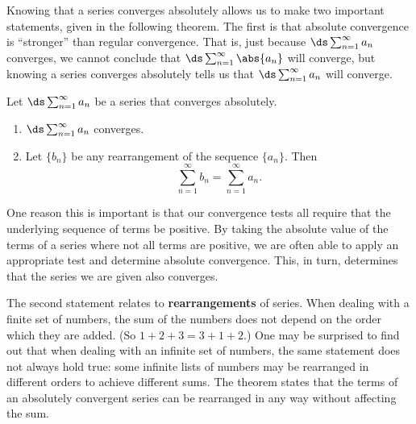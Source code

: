 Knowing that a series converges absolutely allows us to make two important statements, given in the following theorem. The first is that absolute convergence is  ``stronger'' than regular convergence.\vspace{-.5\baselineskip}
That is, just because {\small$\ds \sum_{n=1}^\infty a_n$} converges, we cannot conclude that {\small$\ds \sum_{n=1}^\infty \abs{a_n}$} will converge, but knowing a series converges absolutely tells us that {\small$\ds \sum_{n=1}^\infty a_n$} will converge. 

\begin{theorem}\label{thm:abs_convergence}%
Let $\ds \sum_{n=1}^\infty a_n$ be a series that converges absolutely.
\begin{enumerate}
	\item $\ds \sum_{n=1}^\infty a_n$ converges.
	\item	Let $\{b_n\}$ be any rearrangement of the sequence $\{a_n\}$. Then 
	\[\sum_{n=1}^\infty b_n = \sum_{n=1}^\infty a_n.\]
\end{enumerate}
\end{theorem}

One reason this is important is that our convergence tests all require that the underlying sequence of terms be positive. By taking the absolute value of the terms of a series where not all terms are positive, we are often able to apply an appropriate test and determine absolute convergence. This, in turn, determines that the series we are given also converges.

The second statement relates to \textbf{rearrangements} of series. When dealing with a finite set of numbers, the sum of the numbers does not depend on the order which they are added. (So $1+2+3 = 3+1+2$.) One may be surprised to find out that when dealing with an infinite set of numbers, the same statement does not always hold true: some infinite lists of numbers may be rearranged in different orders to achieve different sums. The theorem states that the terms of an absolutely convergent series can be rearranged in any way without affecting the sum.


